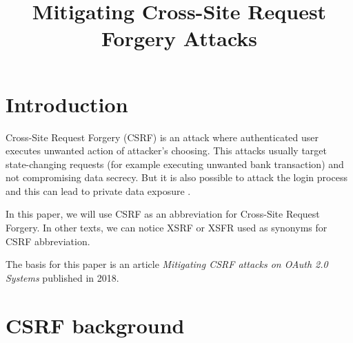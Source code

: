 \documentclass[journal,a4paper,twoside]{template/IEEEtran}
\begin{document}
\title{Mitigating Cross-Site Request Forgery Attacks}


\address{University of Ljubljana, Faculty of Computer and Information Science, Večna pot 113, 1000 Ljubljana, Slovenia\\
E-mail: mm3058@student.uni-lj.si}




\maketitle

\IEEEpeerreviewmaketitle

\section{Introduction}
\label{sec_introduction}

Cross-Site Request Forgery (CSRF) is an attack where authenticated user executes unwanted action of attacker's choosing. This attacks usually target state-changing requests (for example executing unwanted bank transaction) and not compromising data secrecy. But it is also possible to attack the login process and this can lead to private data exposure \cite{barth2008robust}.

In this paper, we will use CSRF as an abbreviation for Cross-Site Request Forgery. In other texts, we can notice XSRF or XSFR used as synonyms for CSRF abbreviation.

The basis for this paper is an article \textit{Mitigating CSRF attacks on OAuth 2.0 Systems} \cite{li2018mitigating} published in 2018.

\section{CSRF background}
\label{sec_csrfbackground}
\end{document}
